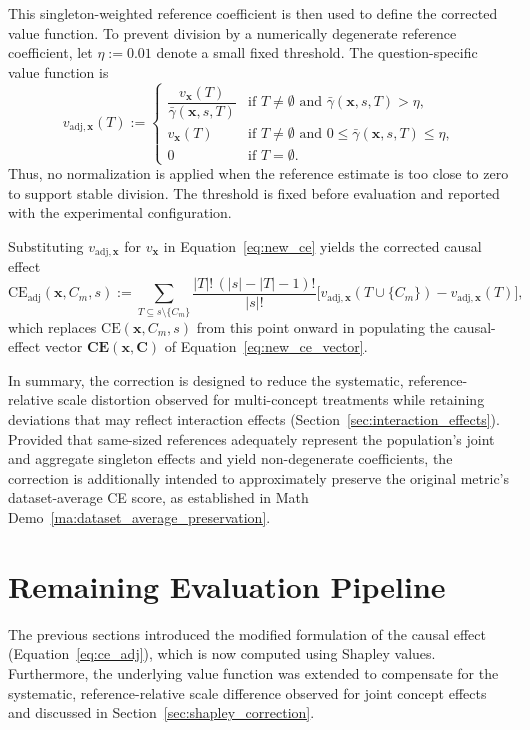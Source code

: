 This singleton-weighted reference coefficient is then used to define the corrected value function. To prevent division by a numerically degenerate reference coefficient, let $\eta:=0.01$ denote a small fixed threshold. The question-specific value function is
\begin{equation}
	\label{eq:v_adj}
	v_{\mathrm{adj},\mathbf{x}}(T) :=
	\begin{cases}
		\dfrac{v_{\mathbf{x}}(T)}{\bar\gamma(\mathbf{x},s,T)} & \text{if }T\neq\emptyset\text{ and }\bar\gamma(\mathbf{x},s,T)>\eta,         \\
		v_{\mathbf{x}}(T)                                     & \text{if }T\neq\emptyset\text{ and }0\leq\bar\gamma(\mathbf{x},s,T)\leq\eta, \\
		0                                                     & \text{if }T=\emptyset.
	\end{cases}
\end{equation}
Thus, no normalization is applied when the reference estimate is too close to zero to support stable division. The threshold is fixed before evaluation and reported with the experimental configuration.

Substituting $v_{\mathrm{adj},\mathbf{x}}$ for $v_{\mathbf{x}}$ in Equation~\ref{eq:new_ce} yields the corrected causal effect
\begin{equation}
	\label{eq:ce_adj}
	\mathrm{CE}_{\mathrm{adj}}(\mathbf{x},C_m,s) := \sum_{T\subseteq s\setminus\{C_m\}} \frac{|T|!\,(|s|-|T|-1)!}{|s|!} \big[v_{\mathrm{adj},\mathbf{x}}(T\cup\{C_m\}) - v_{\mathrm{adj},\mathbf{x}}(T)\big],
\end{equation}
which replaces $\mathrm{CE}(\mathbf{x},C_m,s)$ from this point onward in populating the causal-effect vector $\mathbf{CE}(\mathbf{x},\mathbf{C})$ of Equation~\ref{eq:new_ce_vector}.

In summary, the correction is designed to reduce the systematic, reference-relative scale distortion observed for multi-concept treatments while retaining deviations that may reflect interaction effects (Section~\ref{sec:interaction_effects}). Provided that same-sized references adequately represent the population's joint and aggregate singleton effects and yield non-degenerate coefficients, the correction is additionally intended to approximately preserve the original metric's dataset-average CE score, as established in Math Demo~\ref{ma:dataset_average_preservation}.

\section{Remaining Evaluation Pipeline}
\label{sec:remaining_pipeline}
The previous sections introduced the modified formulation of the causal effect (Equation~\ref{eq:ce_adj}), which is now computed using Shapley values. Furthermore, the underlying value function was extended to compensate for the systematic, reference-relative scale difference observed for joint concept effects and discussed in Section~\ref{sec:shapley_correction}.

